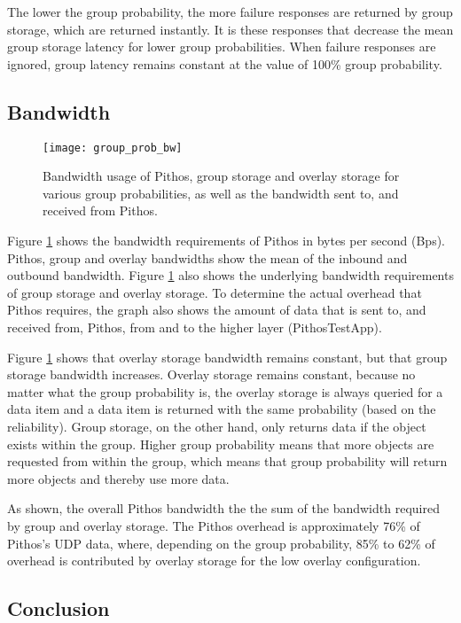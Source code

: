 The lower the group probability, the more failure responses are returned by group storage, which are returned instantly. It is these responses that decrease the mean group storage latency for lower group probabilities. When failure responses are ignored, group latency remains constant at the value of 100\% group probability.

\subsection{Bandwidth}
\label{group_probability_bandwidth}

\begin{figure}[htbp]
 \centering
 \texttt{[image: group\_prob\_bw]}
 \caption{Bandwidth usage of Pithos, group storage and overlay storage for various group probabilities, as well as the bandwidth sent to, and received from Pithos.}
 \label{fig_group_prob_bw}
\end{figure}
%
Figure \ref{fig_group_prob_bw} shows the bandwidth requirements of Pithos in bytes per second (Bps). Pithos, group and overlay bandwidths show the mean of the inbound and outbound bandwidth. Figure \ref{fig_group_prob_bw} also shows the underlying bandwidth requirements of group storage and overlay storage. To determine the actual overhead that Pithos requires, the graph also shows the amount of data that is sent to, and received from, Pithos, from and to the higher layer (PithosTestApp).

Figure \ref{fig_group_prob_bw} shows that overlay storage bandwidth remains constant, but that group storage bandwidth increases. Overlay storage remains constant, because no matter what the group probability is, the overlay storage is always queried for a data item and a data item is returned with the same probability (based on the reliability). Group storage, on the other hand, only returns data if the object exists within the group. Higher group probability means that more objects are requested from within the group, which means that group probability will return more objects and thereby use more data.

As shown, the overall Pithos bandwidth the the sum of the bandwidth required by group and overlay storage. The Pithos overhead is approximately 76\% of Pithos's UDP data, where, depending on the group probability, 85\% to 62\% of overhead is contributed by overlay storage for the low overlay configuration.

\subsection{Conclusion}

